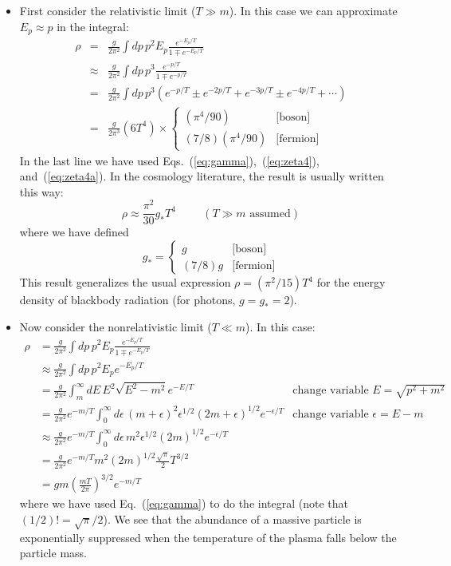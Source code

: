 \documentclass[aps,prd,superscriptaddress,groupedaddress,nofootinbib,nobibnotes]{revtex4}
\newcommand{\be}{\begin{equation}}
\newcommand{\ee}{\end{equation}}
\newcommand{\ba}{\begin{eqnarray}}
\newcommand{\ea}{\end{eqnarray}}
\newcommand{\nn}{\nonumber}
\begin{document}
\begin{itemize}
\item
First consider the relativistic limit ($T \gg m$).  In this case we can approximate $E_p \approx p$ in the integral:
\ba
\rho 
  &=& \frac{g}{2\pi^2} \int dp \, p^2 E_p \frac{e^{-E_p/T}}{1 \mp e^{-E_p/T}} \nn \\
  & \approx & \frac{g}{2\pi^2} \int dp \, p^3 \frac{e^{-p/T}}{1 \mp e^{-p/T}} \nn \\
  & = & \frac{g}{2\pi^2} \int dp \, p^3 \left( e^{-p/T} \pm e^{-2p/T} + e^{-3p/T} \pm e^{-4p/T} + \cdots \right) \nn \\ 
  & = & \frac{g}{2\pi^3} (6 T^4) \times \left\{ \begin{array}{cl} 
     (\pi^4/90) & \mbox{[boson]} \\
     (7/8) (\pi^4/90) & \mbox{[fermion]}
  \end{array} \right.
\ea
In the last line we have used Eqs.~(\ref{eq:gamma}),~(\ref{eq:zeta4}), and~(\ref{eq:zeta4a}).
In the cosmology literature, the result is usually written this way:
\be
\rho \approx \frac{\pi^2}{30} g_* T^4 \hspace{1cm} (\mbox{$T \gg m$ assumed})
\ee
where we have defined
\be
g_* = \left\{ \begin{array}{cl}
  g & \mbox{[boson]} \\
 (7/8) g & \mbox{[fermion]}
\end{array} \right.
\ee
This result generalizes the usual expression $\rho = (\pi^2/15) T^4$ for the energy
density of blackbody radiation (for photons, $g=g_*=2$).

\item
Now consider the nonrelativistic limit ($T \ll m$).  In this case:
\begin{align}
\rho 
  & = \frac{g}{2\pi^2} \int dp \, p^2 E_p \frac{e^{-E_p/T}}{1 \mp e^{-E_p/T}} \nn \\
  & \approx \frac{g}{2\pi^2} \int dp \, p^2 E_p e^{-E_p/T} \nn \\
  & = \frac{g}{2\pi^2} \int_m^\infty dE \, E^2 \sqrt{E^2-m^2} e^{-E/T}  
    & \mbox{change variable $E = \sqrt{p^2+m^2}$} \nn \\
  & = \frac{g}{2\pi^2} e^{-m/T} \int_0^\infty d\epsilon \, (m+\epsilon)^2 \epsilon^{1/2} (2m+\epsilon)^{1/2} e^{-\epsilon/T}
    & \mbox{change variable $\epsilon = E-m$} \nn \\
  & \approx \frac{g}{2\pi^2} e^{-m/T} \int_0^\infty d\epsilon \, m^2 \epsilon^{1/2} (2m)^{1/2} e^{-\epsilon/T} \nn \\
  & = \frac{g}{2\pi^2} e^{-m/T} m^2 (2m)^{1/2} \frac{\sqrt{\pi}}{2} T^{3/2} \nn \\
  & = gm \left( \frac{mT}{2\pi} \right)^{3/2} e^{-m/T}
\end{align}
where we have used Eq.~(\ref{eq:gamma}) to do the integral (note that $(1/2)! = \sqrt{\pi}/2$).
We see that the abundance of a massive particle is exponentially suppressed when the temperature
of the plasma falls below the particle mass.


\end{itemize}
\end{document}
